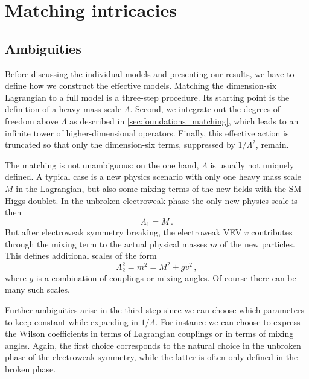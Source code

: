 \section{Matching intricacies}
\label{sec:validity_matching}

\subsection{Ambiguities}
\label{sec:validity_matching_ambiguities}

Before discussing the individual models and presenting our results, we
have to define how we construct the effective models.  Matching the
dimension-six Lagrangian to a full model is a three-step procedure.
Its starting point is the definition of a heavy mass scale $\Lambda$.
Second, we integrate out the degrees of freedom above $\Lambda$ as
described in \autoref{sec:foundations_matching}, which leads to an
infinite tower of higher-dimensional operators.  Finally, this
effective action is truncated so that only the dimension-six terms,
suppressed by $1 / \Lambda^2$, remain.

The matching is not unambiguous: on the one hand, $\Lambda$ is usually
not uniquely defined. A typical case is a new physics scenario with
only one heavy mass scale $M$ in the Lagrangian, but also some mixing
terms of the new fields with the SM Higgs doublet. In the unbroken
electroweak phase the only new physics scale is then
%
\begin{equation}
  \Lambda_1 = M \,.
\end{equation}
%
But after electroweak symmetry breaking, the electroweak VEV $v$
contributes through the mixing term to the actual physical masses $m$
of the new particles. This defines additional scales of the form
%
\begin{equation}
  \Lambda_2^2 = m^2 = M^2 \pm g v^2 \,,
\end{equation}
%
where $g$ is a combination of couplings or mixing angles. Of course
there can be many such scales.

Further ambiguities arise in the third step since we can choose which
parameters to keep constant while expanding in $1/\Lambda$. For
instance we can choose to express the Wilson coefficients in terms of
Lagrangian couplings or in terms of mixing angles. Again, the first
choice corresponds to the natural choice in the unbroken phase of the
electroweak symmetry, while the latter is often only defined in the
broken phase.

